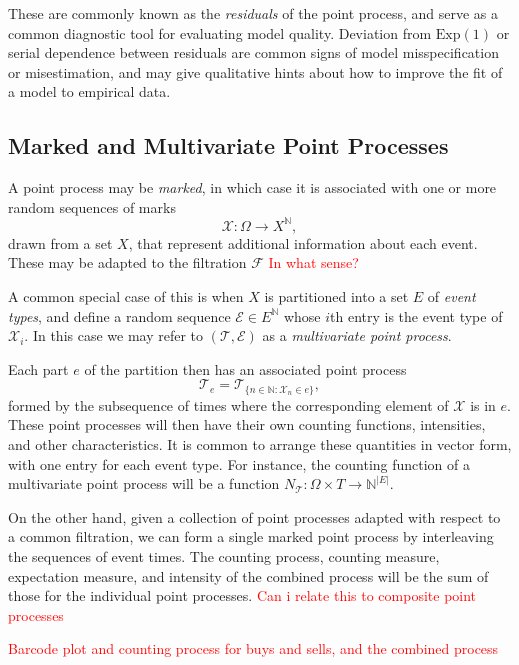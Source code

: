 \documentclass[honours,12pt]{unswthesis}
\numberwithin{equation}{section}
\begin{document}
These are commonly known as the \textit{residuals} of the point process, and serve as a common diagnostic tool for evaluating model quality. Deviation from $\mathrm{Exp}(1)$ or serial dependence between residuals are common signs of model misspecification or misestimation, and may give qualitative hints about how to improve the fit of a model to empirical data.

\subsection{Marked and Multivariate Point Processes}

A point process  may be \textit{marked}, in which case it is associated with one or more random sequences of marks $$\mathcal{X}:\Omega\to X^\mathbb{N},$$
drawn from a set $X$, that represent additional information about each event. These may be adapted to the filtration $\mathcal{F}$ \textcolor{red}{In what sense?}

A common special case of this is when $X$ is partitioned into a set $E$ of \textit{event types}, and define a random sequence $\mathcal{E}\in E^\mathbb{N}$ whose $i$th entry is the event type of $\mathcal{X}_i$. In this case we may refer to $(\mathcal{T},\mathcal{E})$ as a \textit{multivariate point process}.

Each part $e$ of the partition then has an associated point process $$\mathcal{T}_e = \mathcal{T}_{\{n\in\mathbb{N} : \mathcal{X}_n\in e\}},$$ formed by the subsequence of times where the corresponding element of $\mathcal{X}$ is in $e$. These point processes will then have their own counting functions, intensities, and other characteristics. It is common to arrange these quantities in vector form, with one entry for each event type. For instance, the counting function of a multivariate point process will be a function $N_\mathcal{T}:\Omega\times T \to \mathbb{N}^{\vert E\vert}$.

On the other hand, given a collection of point processes adapted with respect to a common filtration, we can form a single marked point process by interleaving the sequences of event times. The counting process, counting measure, expectation measure, and intensity of the combined process will be the sum of those for the individual point processes. \textcolor{red}{Can i relate this to composite point processes}

\textcolor{red}{Barcode plot and counting process for buys and sells, and the combined process}
\end{document}

